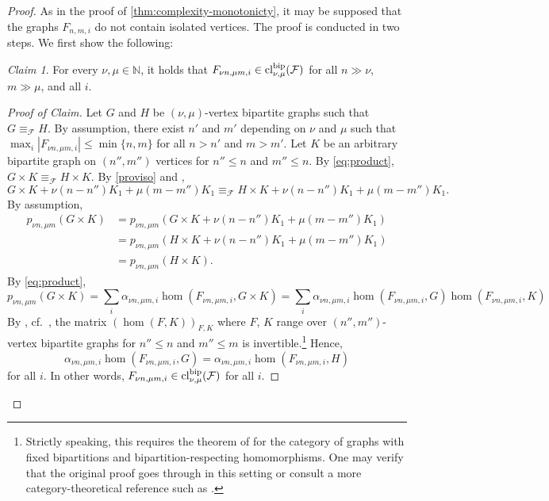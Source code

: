 \documentclass[11pt, DIV=15]{scrarticle}
\theoremstyle{definition}
\theoremstyle{plain}
\theoremstyle{remark}
\newtheorem{claim}{Claim}[definition]
\newenvironment{claimproof}[1][Proof of Claim]{\begin{proof}[#1] \renewcommand{\qedsymbol}{$\lrcorner$}}{ \end{proof}}
\DeclareMathOperator{\cl}{cl}
\begin{document}
	\begin{proof}
		As in the proof of \cref{thm:complexity-monotonicty},
		it may be supposed that the graphs $F_{n,m,i}$ do not contain isolated vertices.
		The proof is conducted in two steps.
		We first show the following:
		\begin{claim}
			For every $\nu, \mu \in \mathbb{N}$,
			it holds that $F_{\nu n, \mu m, i} \in \cl_{\nu, \mu}^{\textup{bip}}(\mathcal{F})$ for all $n \gg \nu$, $m \gg \mu$, and all $i$.
		\end{claim}
		\begin{claimproof}
			Let $G$ and $H$ be $(\nu, \mu)$-vertex bipartite graphs such that $G \equiv_{\mathcal{F}} H$.
			By assumption,
			there exist $n'$ and $m'$ depending on $\nu$ and $\mu$
			such that  $\max_i |F_{\nu n, \mu  m,i }| \leq \min \{n,m\}$
			for all $n > n'$ and $m > m'$.
			Let $K$ be an arbitrary bipartite graph on $(n'',m'')$ vertices for $n'' \leq n$ and $m'' \leq n$.
			By \cref{eq:product},
			$G \times K \equiv_{\mathcal{F}} H \times K$.
			By \cref{proviso} and \cite[Theorem~7]{seppelt_logical_2024},
			\[ G \times K + \nu(n-n'') K_1 + \mu (m-m'') K_1 \equiv_{\mathcal{F}} H \times K  + \nu(n-n'') K_1 + \mu (m-m'') K_1. \]
			By assumption,
			\begin{align*}
				p_{\nu n, \mu m}(G \times K) 
				&=  p_{\nu n, \mu m}(G \times K + \nu(n-n'') K_1 + \mu (m-m'') K_1 ) \\
				&=  p_{\nu n, \mu m}(H \times K+ \nu(n-n'') K_1 + \mu (m-m'') K_1) \\
				&= p_{\nu n, \mu m}(H \times K).
			\end{align*}
			By \cref{eq:product},
			\[
			p_{\nu n, \mu m}(G \times K) 
			= \sum_i \alpha_{\nu n, \mu m,i} \hom(F_{\nu n, \mu m,i}, G \times K)  
			= \sum_i \alpha_{\nu n, \mu m,i} \hom(F_{\nu n, \mu m,i}, G) \hom(F_{\nu n, \mu m,i}, K) 
			\]
			By \cite{lovasz_operations_1967}, cf.\ \cite[Lemma~6]{seppelt_logical_2024},
			the matrix $(\hom(F, K))_{F, K}$ where $F$, $K$ range over $(n'',m'')$-vertex bipartite graphs for $n'' \leq n$ and $m'' \leq m$ is invertible.\footnote{Strictly speaking, this requires the theorem of \textcite{lovasz_operations_1967} for the category of graphs with fixed bipartitions and bipartition-respecting homomorphisms. One may verify that the original proof goes through in this setting or consult a more category-theoretical reference such as \cite{pultr_isomorphism_1973}.}
			Hence,
			\[
			\alpha_{\nu n, \mu m,i} \hom(F_{\nu n, \mu m,i}, G) = \alpha_{\nu n, \mu m,i} \hom(F_{\nu n, \mu m,i}, H)
			\]
			for all $i$.
			In other words, $F_{\nu n, \mu m,i} \in \cl_{\nu, \mu}^{\textup{bip}}(\mathcal{F})$ for all $i$. 
		\end{claimproof}
		

\end{proof}
\end{document}

